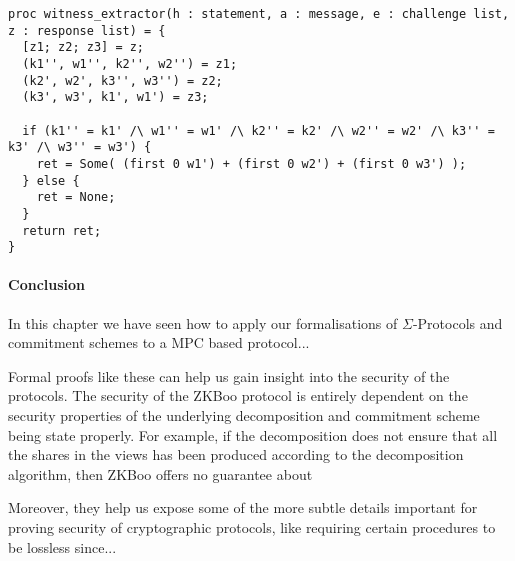 \begin{lstlisting}[float,label=lst:zbkoo_extractor,caption= ZKBoo witness extractor]
proc witness_extractor(h : statement, a : message, e : challenge list, z : response list) = {
  [z1; z2; z3] = z;
  (k1'', w1'', k2'', w2'') = z1;
  (k2', w2', k3'', w3'') = z2;
  (k3', w3', k1', w1') = z3;

  if (k1'' = k1' /\ w1'' = w1' /\ k2'' = k2' /\ w2'' = w2' /\ k3'' = k3' /\ w3'' = w3') {
    ret = Some( (first 0 w1') + (first 0 w2') + (first 0 w3') );
  } else {
    ret = None;
  }
  return ret;
}
\end{lstlisting}



\paragraph{Conclusion}
In this chapter we have seen how to apply our formalisations of
$\Sigma$-Protocols and commitment schemes to a MPC based protocol...

Formal proofs like these can help us gain insight into the security of the
protocols. The security of the ZKBoo protocol is entirely dependent on the
security properties of the underlying decomposition and commitment scheme being
state properly. For example, if the decomposition does not ensure that all the
shares in the views has been produced according to the decomposition algorithm,
then ZKBoo offers no guarantee about

Moreover, they help us expose some of the more subtle details important for
proving security of cryptographic protocols, like requiring certain procedures
to be lossless since...



